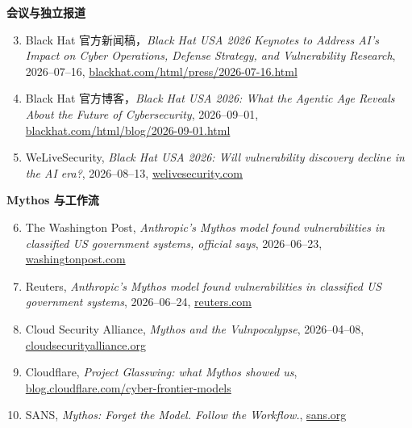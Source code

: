 \documentclass[a4paper,11pt]{article}
\begin{document}
\textbf{会议与独立报道}

\begin{enumerate}\setcounter{enumi}{2}
\item Black Hat 官方新闻稿，\emph{Black Hat USA 2026 Keynotes to Address AI's Impact on Cyber Operations, Defense Strategy, and Vulnerability Research}, 2026--07--16, \href{https://blackhat.com/html/press/2026-07-16.html}{blackhat.com/html/press/2026-07-16.html}
\item Black Hat 官方博客，\emph{Black Hat USA 2026: What the Agentic Age Reveals About the Future of Cybersecurity}, 2026--09--01, \href{https://blackhat.com/html/blog/2026-09-01.html}{blackhat.com/html/blog/2026-09-01.html}
\item WeLiveSecurity, \emph{Black Hat USA 2026: Will vulnerability discovery decline in the AI era?}, 2026--08--13, \href{https://www.welivesecurity.com/en/business-security/black-hat-usa-2026-vulnerability-discovery-decline-ai-era/}{welivesecurity.com}
\end{enumerate}

\textbf{Mythos 与工作流}

\begin{enumerate}\setcounter{enumi}{5}
\item The Washington Post, \emph{Anthropic's Mythos model found vulnerabilities in classified US government systems, official says}, 2026--06--23, \href{https://www.washingtonpost.com/politics/2026/06/23/anthropic-mythos-ai-classified-systems-vulnerabilities-testing/b9abd2e0-6f61-11f1-8730-e7fd0e2a6404_story.html}{washingtonpost.com}
\item Reuters, \emph{Anthropic's Mythos model found vulnerabilities in classified US government systems}, 2026--06--24, \href{https://www.reuters.com/business/anthropics-mythos-model-found-vulnerabilities-classified-us-government-systems-2026-06-24/}{reuters.com}
\item Cloud Security Alliance, \emph{Mythos and the Vulnpocalypse}, 2026--04--08, \href{https://cloudsecurityalliance.org/blog/2026/04/08/anthropic-s-mythos-is-here-defending-from-the-vulnpocalypse}{cloudsecurityalliance.org}
\item Cloudflare, \emph{Project Glasswing: what Mythos showed us}, \href{https://blog.cloudflare.com/cyber-frontier-models/}{blog.cloudflare.com/cyber-frontier-models}
\item SANS, \emph{Mythos: Forget the Model. Follow the Workflow.}, \href{https://www.sans.org/blog/mythos-forget-model-follow-workflow}{sans.org}
\end{enumerate}
\end{document}
